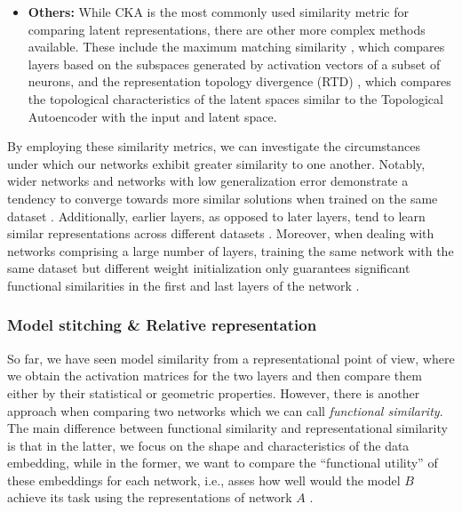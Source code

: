 \documentclass[../main.tex]{subfiles}
\begin{document}
\begin{itemize}
    \item \textbf{Others:} While CKA is the most commonly used similarity metric for comparing latent representations, there are other more complex methods available.  These include the maximum matching similarity \cite{wang_towards_2018}, which compares layers based on the subspaces generated by activation vectors of a subset of neurons, and the representation topology divergence (RTD) \cite{barannikov_representation_2022}, which compares the topological characteristics of the latent spaces similar to the Topological Autoencoder with the input and latent space.
    
\end{itemize}

By employing these similarity metrics, we can investigate the circumstances under which our networks exhibit greater similarity to one another. Notably, wider networks and networks with low generalization error demonstrate a tendency to converge towards more similar solutions when trained on the same dataset \cite{morcos_insights_2018}. Additionally, earlier layers, as opposed to later layers, tend to learn similar representations across different datasets \cite{barannikov_representation_2022}. Moreover, when dealing with networks comprising a large number of layers, training the same network with the same dataset but different weight initialization only guarantees significant functional similarities in the first and last layers of the network \cite{wang_towards_2018}.


\subsubsection*{Model stitching \& Relative representation}

So far, we have seen model similarity from a representational point of view, where we obtain the activation matrices for the two layers and then compare them either by their statistical or geometric properties. However, there is another approach when comparing two networks which we can call \emph{functional similarity}. The main difference between functional similarity and representational similarity is that in the latter, we focus on the shape and characteristics of the data embedding, while in the former, we want to compare the ``functional utility'' of these embeddings for each network, i.e., asses how well would the model $B$ achieve its task using the representations of network $A$ \cite{csiszarik_similarity_2021}.\\
\end{document}
